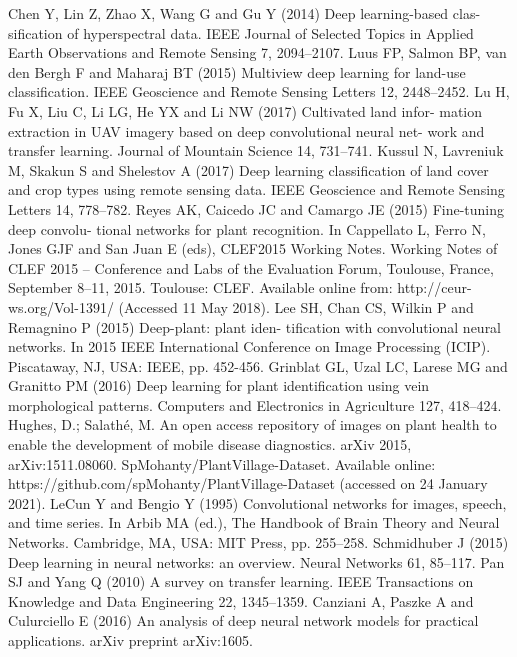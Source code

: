 \documentclass[11pt]{report}
\begin{document}
\begin{thebibliography}{100}
	\bibitem{} Chen Y, Lin Z, Zhao X, Wang G and Gu Y (2014) Deep learning-based clas-
	sification of hyperspectral data. IEEE Journal of Selected Topics in Applied
	Earth Observations and Remote Sensing 7, 2094–2107.
	\bibitem{} Luus FP, Salmon BP, van den Bergh F and Maharaj BT (2015) Multiview
	deep learning for land-use classification. IEEE Geoscience and Remote
	Sensing Letters 12, 2448–2452.
	\bibitem{} Lu H, Fu X, Liu C, Li LG, He YX and Li NW (2017) Cultivated land infor-
	mation extraction in UAV imagery based on deep convolutional neural net-
	work and transfer learning. Journal of Mountain Science 14, 731–741.
	\bibitem{} Kussul N, Lavreniuk M, Skakun S and Shelestov A (2017) Deep learning
	classification of land cover and crop types using remote sensing data.
	IEEE Geoscience and Remote Sensing Letters 14, 778–782.
	\bibitem{} Reyes AK, Caicedo JC and Camargo JE (2015) Fine-tuning deep convolu-
	tional networks for plant recognition. In Cappellato L, Ferro N,
	Jones GJF and San Juan E (eds), CLEF2015 Working Notes. Working
	Notes of CLEF 2015 – Conference and Labs of the Evaluation Forum,
	Toulouse, France, September 8–11, 2015. Toulouse: CLEF. Available online
	from: http://ceur-ws.org/Vol-1391/ (Accessed 11 May 2018).
	\bibitem{} Lee SH, Chan CS, Wilkin P and Remagnino P (2015) Deep-plant: plant iden-
	tification with convolutional neural networks. In 2015 IEEE International
	Conference on Image Processing (ICIP). Piscataway, NJ, USA: IEEE,
	pp. 452-456.
	\bibitem{} Grinblat GL, Uzal LC, Larese MG and Granitto PM (2016) Deep learning for
	plant identification using vein morphological patterns. Computers and
	Electronics in Agriculture 127, 418–424.
	 Hughes, D.; Salathé, M. An open access repository of images on plant health to enable the development of mobile disease
	diagnostics. arXiv 2015, arXiv:1511.08060.
	 SpMohanty/PlantVillage-Dataset. Available online: https://github.com/spMohanty/PlantVillage-Dataset (accessed on 24
	January 2021).
	 LeCun Y and Bengio Y (1995) Convolutional networks for images, speech,
	and time series. In Arbib MA (ed.), The Handbook of Brain Theory and
	Neural Networks. Cambridge, MA, USA: MIT Press, pp. 255–258.
	 Schmidhuber J (2015) Deep learning in neural networks: an overview. Neural
	Networks 61, 85–117.
	 Pan SJ and Yang Q (2010) A survey on transfer learning. IEEE Transactions
	on Knowledge and Data Engineering 22, 1345–1359.
	 Canziani A, Paszke A and Culurciello E (2016) An analysis of deep neural
	network models for practical applications. arXiv preprint arXiv:1605.

\end{thebibliography}
\end{document}
